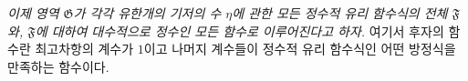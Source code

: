 
\emph{이제 영역 $\mathfrak G$가 각각 유한개의 기저의 수 $\eta$에 관한 모든 정수적 유리 함수식의 전체 $\mathfrak F$와, $\mathfrak F$에 대하여 대수적으로 정수인 모든 함수로 이루어진다고 하자.} 여기서 후자의 함수란 최고차항의 계수가 $1$이고 나머지 계수들이 정수적 유리 함수식인 어떤 방정식을 만족하는 함수이다.
